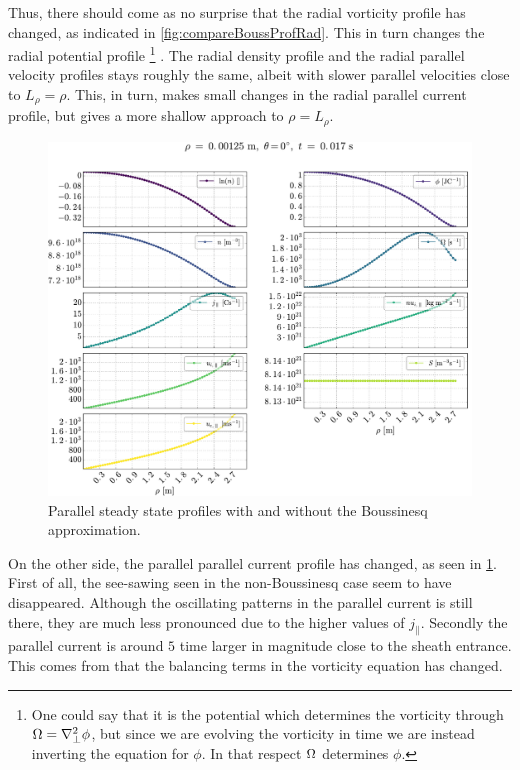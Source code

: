 Thus, there should come as no surprise that the radial vorticity profile has changed, as indicated in \cref{fig:compareBoussProfRad}.
This in turn changes the radial potential profile%
%
\footnote{One could say that it is the potential which determines the vorticity through $\Omega = \nabla_\perp^2 \phi$, but since we are evolving the vorticity in time we are instead inverting the equation for $\phi$.
In that respect $\Omega$ determines $\phi$.}%
%
.
The radial density profile and the radial parallel velocity profiles stays roughly the same, albeit with slower parallel velocities close to $L_\rho = \rho$.
This, in turn, makes small changes in the radial parallel current profile, but gives a more shallow approach to $\rho=L_\rho$.
%
\begin{figure}[h]
    \centering
    \includegraphics[width=1.0\textwidth]{fig/results/compareBouss/1DProfPar001B}
    \caption{Parallel steady state profiles with and without the Boussinesq approximation.}
    \label{fig:compareBoussProfPar}
\end{figure}
%
On the other side, the parallel parallel current profile has changed, as seen in \cref{fig:compareBoussProfPar}.
First of all, the see-sawing seen in the non-Boussinesq case seem to have disappeared.
Although the oscillating patterns in the parallel current is still there, they are much less pronounced due to the higher values of $j_\|$.
Secondly the parallel current is around $5$ time larger in magnitude close to the sheath entrance.
This comes from that the balancing terms in the vorticity equation has changed.

